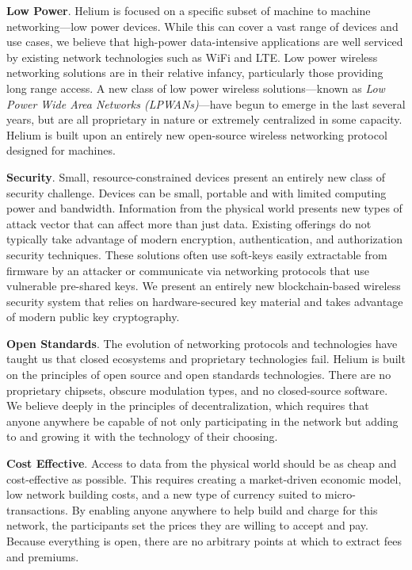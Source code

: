 \documentclass[10pt, nonatbib, nocopyrightspace, reprint]{sigplanconf}
\begin{document}
\textbf{Low Power}. Helium is focused on a specific subset of machine to machine networking---low power devices. While this can cover a vast range of devices and use cases, we believe that high-power data-intensive applications are well serviced by existing network technologies such as WiFi and LTE\@. Low power wireless networking solutions are in their relative infancy, particularly those providing long range access. A new class of low power wireless solutions---known as \emph{Low Power Wide Area Networks (LPWANs)}---have begun to emerge in the last several years, but are all proprietary in nature or extremely centralized in some capacity. Helium is built upon an entirely new open-source wireless networking protocol designed for machines.

\textbf{Security}. Small, resource-constrained devices present an entirely new class of security challenge. Devices can be small, portable and with limited computing power and bandwidth. Information from the physical world presents new types of attack vector that can affect more than just data. Existing offerings do not typically take advantage of modern encryption, authentication, and authorization security techniques. These solutions often use soft-keys easily extractable from firmware by an attacker or communicate via networking protocols that use vulnerable pre-shared keys. We present an entirely new blockchain-based wireless security system that relies on hardware-secured key material and takes advantage of modern public key cryptography.

\textbf{Open Standards}. The evolution of networking protocols and technologies have taught us that closed ecosystems and proprietary technologies fail. Helium is built on the principles of open source and open standards technologies. There are no proprietary chipsets, obscure modulation types, and no closed-source software. We believe deeply in the principles of decentralization, which requires that anyone anywhere be capable of not only participating in the network but adding to and growing it with the technology of their choosing.

\textbf{Cost Effective}. Access to data from the physical world should be as cheap and cost-effective as possible. This requires creating a market-driven economic model, low network building costs, and a new type of currency suited to micro-transactions. By enabling anyone anywhere to help build and charge for this network, the participants set the prices they are willing to accept and pay. Because everything is open, there are no arbitrary points at which to extract fees and premiums.
\end{document}
